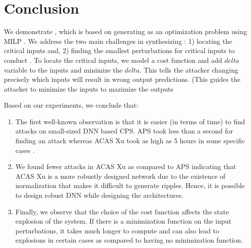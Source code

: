 \chapter{Conclusion}
We demonstrate \tool, which is based on generating \attack as an optimization problem using MILP . We address the two main challenges in synthesizing \attack: 1) locating the critical inputs and, 2) finding the smallest perturbations for critical inputs to conduct \attack. To locate the critical inputs, we model a cost function and add $delta$ variable to the inputs and minimize the $delta$. This tells the attacker changing precisely which inputs will result in wrong output predictions. 
(This guides the attacker to minimize the inputs to mazimize the outputs 


Based on our experiments, we conclude that:

\begin{enumerate}
    \item The first well-known observation is that it is easier (in terms of time) to find attacks on small-sized DNN based CPS. APS took less than a second for finding an attack whereas ACAS Xu took as high as 5 hours in some specific cases . 

\item We found fewer attacks in ACAS Xu as compared to APS indicating  that ACAS Xu is a more robustly designed network due to the existence of normalization that makes it difficult to generate ripples. Hence, it is possible to design robust DNN while designing the architectures. 

\item Finally, we observe that the choice of the cost function affects the state explosion of the system. If there is a minimization function on the input perturbations, it takes much longer to compute and can also lead to explosions  in certain cases as compared to having no minimization function. 
\end{enumerate}






